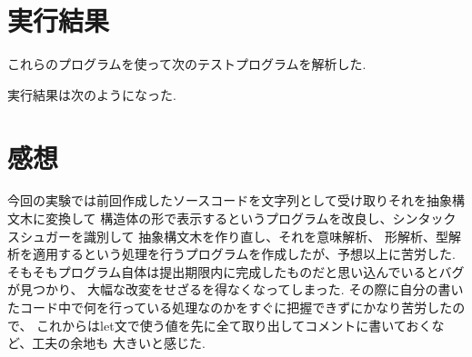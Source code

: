 \documentclass[a4j,dvipdfmx]{jarticle}
\begin{document}
\section{実行結果}
これらのプログラムを使って次のテストプログラムを解析した.

実行結果は次のようになった.

\section{感想}
今回の実験では前回作成したソースコードを文字列として受け取りそれを抽象構文木に変換して
構造体の形で表示するというプログラムを改良し、シンタックスシュガーを識別して
抽象構文木を作り直し、それを意味解析、
形解析、型解析を適用するという処理を行うプログラムを作成したが、予想以上に苦労した.
そもそもプログラム自体は提出期限内に完成したものだと思い込んでいるとバグが見つかり、
大幅な改変をせざるを得なくなってしまった.
その際に自分の書いたコード中で何を行っている処理なのかをすぐに把握できずにかなり苦労したので、
これからはlet文で使う値を先に全て取り出してコメントに書いておくなど、工夫の余地も
大きいと感じた.
\end{document}
